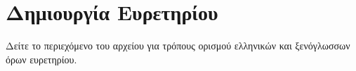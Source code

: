 \chapter{Δημιουργία Ευρετηρίου}
Δείτε το περιεχόμενο του αρχείου  για τρόπους ορισμού ελληνικών και ξενόγλωσσων όρων ευρετηρίου.

   

       
